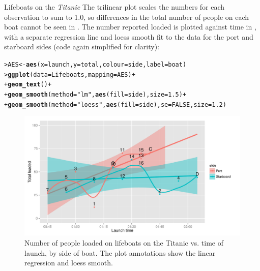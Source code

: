 \documentclass[10pt,krantz2]{krantz}\usepackage[]{graphicx}\usepackage[]{color}
\makeatletter
\newcommand{\hlnum}[1]{\textcolor[rgb]{0.686,0.059,0.569}{#1}}%
\newcommand{\hlstr}[1]{\textcolor[rgb]{0.192,0.494,0.8}{#1}}%
\newcommand{\hlopt}[1]{\textcolor[rgb]{0,0,0}{#1}}%
\newcommand{\hlstd}[1]{\textcolor[rgb]{0.345,0.345,0.345}{#1}}%
\newcommand{\hlkwb}[1]{\textcolor[rgb]{0.69,0.353,0.396}{#1}}%
\newcommand{\hlkwc}[1]{\textcolor[rgb]{0.333,0.667,0.333}{#1}}%
\newcommand{\hlkwd}[1]{\textcolor[rgb]{0.737,0.353,0.396}{\textbf{#1}}}%
\newenvironment{kframe}{%
 \def\at@end@of@kframe{}%
 \ifinner\ifhmode%
  \def\at@end@of@kframe{\end{minipage}}%
  \begin{minipage}{\columnwidth}%
 \fi\fi%
 \def\FrameCommand##1{\hskip\@totalleftmargin \hskip-\fboxsep
 \colorbox{shadecolor}{##1}\hskip-\fboxsep
     \hskip-\linewidth \hskip-\@totalleftmargin \hskip\columnwidth}%
 \MakeFramed {\advance\hsize-\width
   \@totalleftmargin\z@ \linewidth\hsize
   \@setminipage}}%
 {\par\unskip\endMakeFramed%
 \at@end@of@kframe}
\newenvironment{knitrout}{}{} %
\renewenvironment{knitrout}{\small\renewcommand{\baselinestretch}{.85}}{} %
\makeatother
\begin{document}
\begin{Example}[lifeboat1]{Lifeboats on the \emph{Titanic}}
The trilinear plot scales the numbers for each observation to sum
to 1.0, so differences in the total number of people on each boat
cannot be seen in .
The  number reported loaded is plotted against
 time in ,
with a separate regression line and loess smooth
fit to the data for the port and starboard
sides (code again simplified for clarity):
\begin{knitrout}
\color{fgcolor}\begin{kframe}
\begin{alltt}
\hlstd{> }\hlstd{AES} \hlkwb{<-} \hlkwd{aes}\hlstd{(}\hlkwc{x} \hlstd{= launch,} \hlkwc{y} \hlstd{= total,} \hlkwc{colour} \hlstd{= side,} \hlkwc{label} \hlstd{= boat)}
\hlstd{> }\hlkwd{ggplot}\hlstd{(}\hlkwc{data} \hlstd{= Lifeboats,} \hlkwc{mapping} \hlstd{= AES)} \hlopt{+}
\hlstd{+ }     \hlkwd{geom_text}\hlstd{()} \hlopt{+}
\hlstd{+ }     \hlkwd{geom_smooth}\hlstd{(}\hlkwc{method} \hlstd{=} \hlstr{"lm"}\hlstd{,} \hlkwd{aes}\hlstd{(}\hlkwc{fill} \hlstd{= side),} \hlkwc{size} \hlstd{=} \hlnum{1.5}\hlstd{)} \hlopt{+}
\hlstd{+ }     \hlkwd{geom_smooth}\hlstd{(}\hlkwc{method} \hlstd{=} \hlstr{"loess"}\hlstd{,} \hlkwd{aes}\hlstd{(}\hlkwc{fill} \hlstd{= side),} \hlkwc{se} \hlstd{=} \hlnum{FALSE}\hlstd{,} \hlkwc{size} \hlstd{=} \hlnum{1.2}\hlstd{)}
\end{alltt}
\end{kframe}
\end{knitrout}
\begin{knitrout}
\color{fgcolor}\begin{figure}[!htbp]

\centerline{\includegraphics[width=.8\textwidth]{ch04/fig/lifeboats2-1} }

\caption[Number of people loaded on lifeboats on the Titanic vs]{Number of people loaded on lifeboats on the Titanic vs. time of launch, by side of boat. The plot annotations show the linear regression and loess smooth.\label{fig:lifeboats2}}
\end{figure}



\end{knitrout}
\end{Example}
\end{document}
